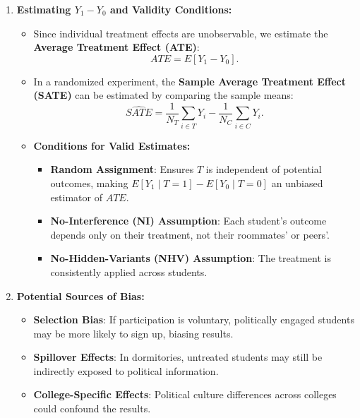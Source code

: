 \documentclass[12pt]{article}
\begin{document}
\begin{enumerate}
\begin{enumerate}[label=(\alph*)]
    \item \textbf{Estimating \( Y_1 - Y_0 \) and Validity Conditions:}
    \begin{itemize}
        \item Since individual treatment effects are unobservable, we estimate the \textbf{Average Treatment Effect (ATE)}:
        \[
        ATE = E[Y_1 - Y_0].
        \]
        \item In a randomized experiment, the \textbf{Sample Average Treatment Effect (SATE)} can be estimated by comparing the sample means:
        \[
        \widehat{SATE} = \frac{1}{N_T} \sum_{i \in T} Y_i - \frac{1}{N_C} \sum_{i \in C} Y_i.
        \]
        \item \textbf{Conditions for Valid Estimates:}
        \begin{itemize}
            \item \textbf{Random Assignment}: Ensures \( T \) is independent of potential outcomes, making \( E[Y_1 \mid T=1] - E[Y_0 \mid T=0] \) an unbiased estimator of \( ATE \).
            \item \textbf{No-Interference (NI) Assumption}: Each student's outcome depends only on their treatment, not their roommates’ or peers'.
            \item \textbf{No-Hidden-Variants (NHV) Assumption}: The treatment is consistently applied across students.
        \end{itemize}
    \end{itemize}

    \item \textbf{Potential Sources of Bias:}
    \begin{itemize}
        \item \textbf{Selection Bias}: If participation is voluntary, politically engaged students may be more likely to sign up, biasing results.
        \item \textbf{Spillover Effects}: In dormitories, untreated students may still be indirectly exposed to political information.
        \item \textbf{College-Specific Effects}: Political culture differences across colleges could confound the results.
    \end{itemize}


\end{enumerate}
\end{enumerate}
\end{document}
